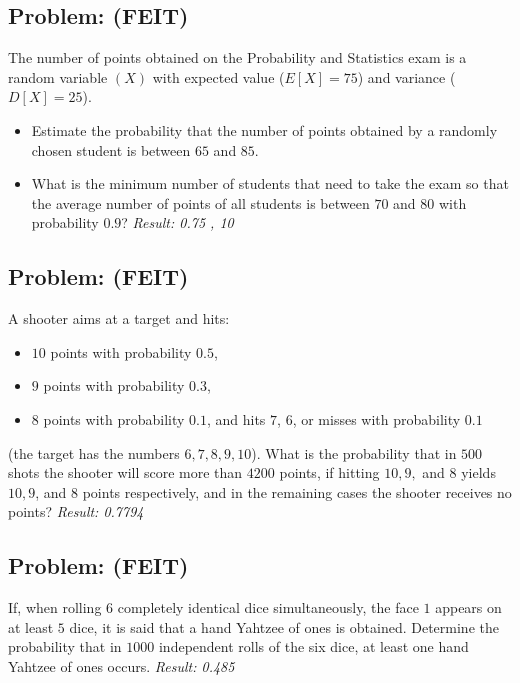 \documentclass[a4paper, 12pt]{article}
\begin{document}
\subsection{Problem: (FEIT)}
The number of points obtained on the Probability and Statistics exam is a random variable $(X)$ with expected value ($E[X] = 75$) and variance ($D[X] = 25$).


\begin{itemize}
  \item [a)] Estimate the probability that the number of points obtained by a randomly chosen student is between $65$ and $85$.
  \item [b)] What is the minimum number of students that need to take the exam so that the average number of points of all students is between $70$ and $80$ with probability $0.9$?
\textit{Result: {0.75 , 10}}
\end{itemize}




\subsection{Problem: (FEIT)}
A shooter aims at a target and hits:
\begin{itemize}
  \item $10$ points with probability $0.5$,
\item  $9$ points with probability $0.3$,
\item  $8$ points with probability $0.1$,
and hits $7$, $6$, or misses with probability $0.1$
\end{itemize}
(the target has the numbers $6, 7, 8, 9, 10$).
What is the probability that in $500$ shots the shooter will score more than $4200$ points, if hitting $10, 9,$ and $8$ yields $10, 9$, and $8$ points respectively, and in the remaining cases the shooter receives no points?
\textit{Result: {0.7794}}


\subsection{Problem: (FEIT)}
If, when rolling $6$ completely identical dice simultaneously, the face $1$ appears on at least $5$ dice, it is said that a hand Yahtzee of ones is obtained. Determine the probability that in $1000$ independent rolls of the six dice, at least one hand Yahtzee of ones occurs.
\textit{Result: {0.485}}


  
\end{document}
